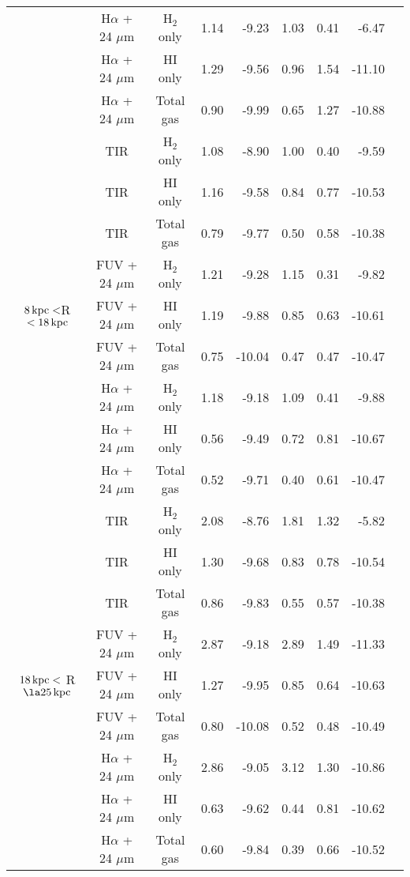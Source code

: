 \documentclass[useAMS,usenatbib]{mn2e}
\newcommand \kpc        {\,{\rm kpc}}
\begin{document}
\begin{table*}
\begin{tabular}{ccccrccrr}
 & H$\alpha$ + 24 $\mu$m & H$_2$ only & 1.14 & -9.23  & 1.03    & 0.41    & -6.47      \\
 & H$\alpha$ + 24 $\mu$m & HI only    & 1.29 & -9.56  & 0.96    & 1.54    & -11.10     \\
 & H$\alpha$ + 24 $\mu$m & Total gas  & 0.90 & -9.99  & 0.65    & 1.27    & -10.88    \\
\hline
\multicolumn{1}{c}{\multirow{9}{*}{$8\kpc < $R $< 18\kpc$}} & TIR               & H$_2$ only & 1.08 & -8.90  & 1.00    & 0.40    & -9.59      \\
 & TIR               & HI only    & 1.16 & -9.58  & 0.84    & 0.77    & -10.53     \\
 & TIR               & Total gas  & 0.79 & -9.77  & 0.50    & 0.58    & -10.38     \\
 & FUV + 24 $\mu$m       & H$_2$ only & 1.21 & -9.28  & 1.15    & 0.31    & -9.82      \\
 & FUV + 24 $\mu$m       & HI only    & 1.19 & -9.88  & 0.85    & 0.63    & -10.61     \\
 & FUV + 24 $\mu$m       & Total gas  & 0.75 & -10.04 & 0.47    & 0.47    & -10.47     \\
 & H$\alpha$ + 24 $\mu$m & H$_2$ only & 1.18 & -9.18  & 1.09    & 0.41    & -9.88      \\
 & H$\alpha$ + 24 $\mu$m & HI only    & 0.56 & -9.49  & 0.72    & 0.81    & -10.67     \\
 & H$\alpha$ + 24 $\mu$m & Total gas  & 0.52 & -9.71  & 0.40    & 0.61    & -10.47  \\
\hline
\multicolumn{1}{c}{\multirow{9}{*}{$18\kpc <$ R $\la 25\kpc$}} & TIR               & H$_2$ only & 2.08 & -8.76  & 1.81    & 1.32    & -5.82      \\
 & TIR               & HI only    & 1.30 & -9.68  & 0.83    & 0.78    & -10.54     \\
 & TIR               & Total gas  & 0.86 & -9.83  & 0.55    & 0.57    & -10.38     \\
 & FUV + 24 $\mu$m       & H$_2$ only & 2.87 & -9.18  & 2.89    & 1.49    & -11.33     \\
 & FUV + 24 $\mu$m       & HI only    & 1.27 & -9.95  & 0.85    & 0.64    & -10.63     \\
 & FUV + 24 $\mu$m       & Total gas  & 0.80 & -10.08 & 0.52    & 0.48    & -10.49     \\
 & H$\alpha$ + 24 $\mu$m & H$_2$ only & 2.86 & -9.05  & 3.12    & 1.30    & -10.86     \\
 & H$\alpha$ + 24 $\mu$m & HI only    & 0.63 & -9.62  & 0.44    & 0.81    & -10.62     \\
 & H$\alpha$ + 24 $\mu$m & Total gas  & 0.60 & -9.84  & 0.39    & 0.66    & -10.52     \\
 \hline
\end{tabular}
\end{table*}
\end{document}
